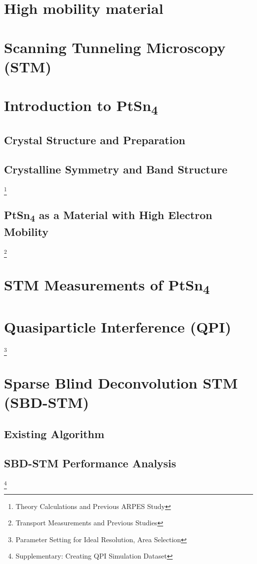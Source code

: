 \chapter{High mobility material}

\chapter{Scanning Tunneling Microscopy (STM)}
	

\chapter{Introduction to PtSn\textsubscript{4}}
	\section{Crystal Structure and Preparation}
	\section{Crystalline Symmetry and Band Structure}
\footnote{Theory Calculations and Previous ARPES Study}
	\section{PtSn\textsubscript{4} as a Material with High Electron Mobility}
	\footnote{Transport Measurements and Previous Studies}

\chapter{STM Measurements of PtSn\textsubscript{4}}


\chapter{Quasiparticle Interference (QPI)}

	\footnote{Parameter Setting for Ideal Resolution, Area Selection}

\chapter{Sparse Blind Deconvolution STM (SBD-STM)}
\section{Existing Algorithm}
\section{SBD-STM Performance Analysis}
\footnote{Supplementary: Creating QPI Simulation Dataset}
